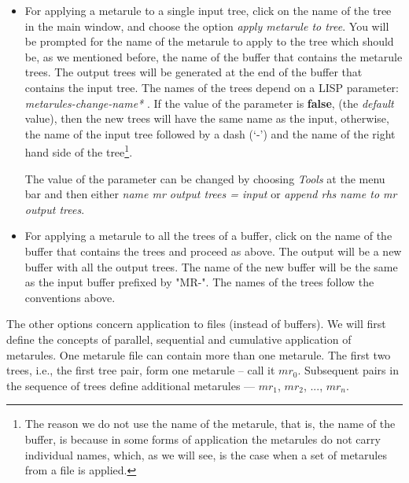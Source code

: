 \begin{itemize} 
\item   For applying a metarule to a single input tree, click on the name of 
	the tree in the main window, and choose the option {\it apply metarule         to tree}.  You will be prompted for the name of the metarule to apply 
        to the tree which should be, as we mentioned before, the name of the 
        buffer that contains the metarule trees. The output trees will be 
        generated at the end of the buffer that contains the input tree. The 
        names of the trees depend on a LISP parameter: {\it         *metarules-change-name* }.  If the value of the parameter is {\bf         false}, (the {\it default} value), then the new trees will have the 
        same name as the input, otherwise, the name of the input tree followed 
        by a dash (`-') and the name of the right hand side of the 
        tree\footnote{The reason we do not use the name of the metarule, that         is, the name of the buffer, is because in some forms of application the         metarules do not carry individual names, which, as we will see, is the         case when a set of metarules from a file is applied.}. 
 
        The value of the parameter can be changed by choosing {\it Tools} 
        at the menu bar and then either {\it name mr output trees =         input}  or {\it append rhs name to mr output trees}. 
 
        
\item   For applying a metarule to all the trees of a buffer, click on the name 
	of the buffer that contains the trees and proceed as above. The output 
        will be a new buffer with all the output trees. The name of the new 
        buffer will be the same as the input buffer prefixed by "MR-". The 
        names of the trees follow the conventions above. 
 
\end{itemize} 
 
The other options concern application to files (instead of buffers). 
We will first define 
the concepts of parallel, sequential and cumulative application of metarules. 
One metarule 
file can contain more than one metarule. The first two trees, i.e., the first 
tree pair, form one metarule -- call it $mr_0$. Subsequent pairs in the 
sequence of trees define additional metarules --- 
$mr_1$, $mr_2$, ..., $mr_n$. 
 

